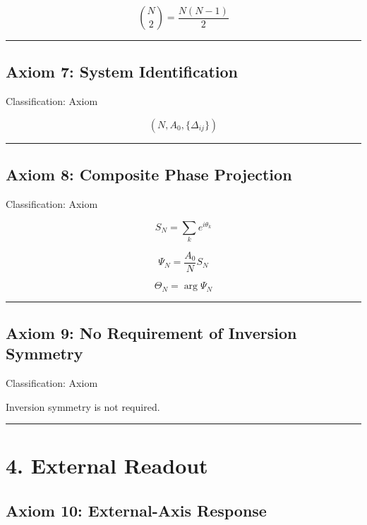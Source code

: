 \documentclass[
  a4paper,
]{article}
\begin{document}
\[
\binom{N}{2}=\frac{N(N-1)}{2}
\]

\begin{center}\rule{0.5\linewidth}{0.5pt}\end{center}

\subsection{Axiom 7: System
Identification}\label{axiom-7-system-identification}

Classification: Axiom

\[
(N,A_0,\{\Delta_{ij}\})
\]

\begin{center}\rule{0.5\linewidth}{0.5pt}\end{center}

\subsection{Axiom 8: Composite Phase
Projection}\label{axiom-8-composite-phase-projection}

Classification: Axiom

\[
S_N=\sum_k e^{i\theta_k}
\]

\[
\Psi_N=\frac{A_0}{N}S_N
\]

\[
\Theta_N=\arg\Psi_N
\]

\begin{center}\rule{0.5\linewidth}{0.5pt}\end{center}

\subsection{Axiom 9: No Requirement of Inversion
Symmetry}\label{axiom-9-no-requirement-of-inversion-symmetry}

Classification: Axiom

Inversion symmetry is not required.

\begin{center}\rule{0.5\linewidth}{0.5pt}\end{center}

\section{4. External Readout}\label{external-readout}

\subsection{Axiom 10: External-Axis
Response}\label{axiom-10-external-axis-response}
\end{document}
